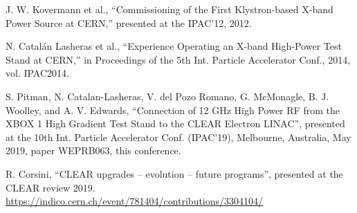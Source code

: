 \documentclass[a4paper,
               keeplastbox,   %
               ]{jacow}
\begin{document}
\begin{thebibliography}{99}
 J. W. Kovermann et al., “Commissioning of the First Klystron-based X-band Power Source at CERN,” presented at the IPAC’12, 2012.

 N. Catalán Lasheras et al., “Experience Operating an X-band High-Power Test Stand at CERN,” in Proceedings of the 5th Int. Particle Accelerator Conf., 2014, vol. IPAC2014.

   S. Pitman, N. Catalan-Lasheras, V. del Pozo Romano, G. McMonagle, B. J. Woolley, and A. V. Edwards,
   \textquotedblleft{Connection of 12 GHz High Power RF from the XBOX 1 High Gradient Test Stand to the CLEAR Electron LINAC}\textquotedblright,
   presented at the 10th Int. Particle Accelerator Conf. (IPAC'19), Melbourne, Australia, May 2019, paper WEPRB063, this conference.

 R. Corsini, ``CLEAR upgrades -- evolution -- future programs'', presented at the CLEAR review 2019. \url{https://indico.cern.ch/event/781404/contributions/3304104/}

\end{thebibliography}
\end{document}

